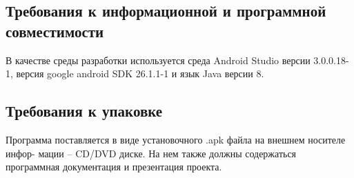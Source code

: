 \subsection{Требования к информационной и программной совместимости}
В качестве среды разработки используется среда Android Studio версии
3.0.0.18-1, версия google android SDK 26.1.1-1 и язык Java версии 8.

\subsection{Требования к упаковке}
Программа поставляется в виде установочного .apk файла на внешнем носителе инфор-
мации – CD/DVD диске. На нем также должны содержаться программная документация
и презентация проекта.


